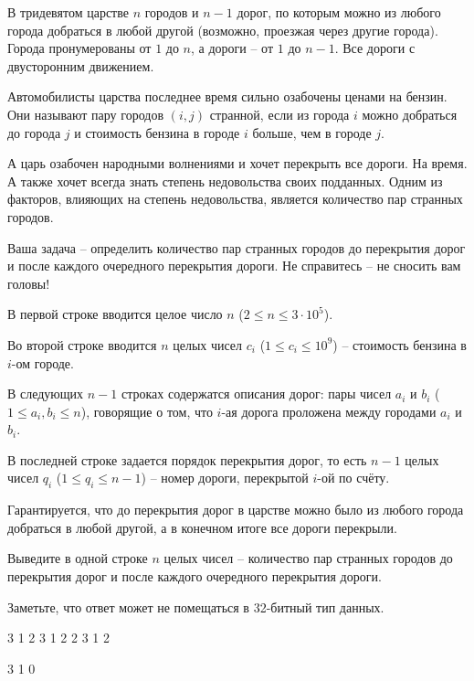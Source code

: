 
В тридевятом царстве $n$ городов и $n - 1$ дорог, по которым можно из любого города добраться в любой другой (возможно, проезжая через другие города). Города пронумерованы от $1$ до $n$, а дороги -- от $1$ до $n - 1$. Все дороги с двусторонним движением.

Автомобилисты царства последнее время сильно озабочены ценами на бензин. Они называют пару городов $(i, j)$ странной, если из города $i$ можно добраться до города $j$ и стоимость бензина в городе $i$ больше, чем в городе $j$.

А царь озабочен народными волнениями и хочет перекрыть все дороги. На время. А также хочет всегда знать степень недовольства своих подданных. Одним из факторов, влияющих на степень недовольства, является количество пар странных городов.

Ваша задача -- определить количество пар странных городов до перекрытия дорог и после каждого очередного перекрытия дороги. Не справитесь -- не сносить вам головы!


В первой строке вводится целое число $n$ ($2 \le n \le 3 \cdot 10^5$).

Во второй строке вводится $n$ целых чисел $c_i$ ($1 \le c_i \le 10^9$) -- стоимость бензина в $i$-ом городе.

В следующих $n - 1$ строках содержатся описания дорог: пары чисел $a_i$ и $b_i$ \linebreak ($1 \le a_i, b_i \le n$), говорящие о том, что $i$-ая дорога проложена между городами $a_i$ и $b_i$.

В последней строке задается порядок перекрытия дорог, то есть $n - 1$ целых чисел $q_i$ ($1 \le q_i \le n-1$) -- номер дороги, перекрытой $i$-ой по счёту.

Гарантируется, что до перекрытия дорог в царстве можно было из любого города добраться в любой другой, а в конечном итоге все дороги перекрыли.

\outputfmtSection

Выведите в одной строке $n$ целых чисел -- количество пар странных городов до перекрытия дорог и после каждого очередного перекрытия дороги.

Заметьте, что ответ может не помещаться в 32-битный тип данных.

\exampleSection


\begin{myverbbox}[\small]{\vinput}
3
1 2 3
1 2
2 3
1 2
\end{myverbbox}
\begin{myverbbox}[\small]{\voutput}
3 1 0
\end{myverbbox}


